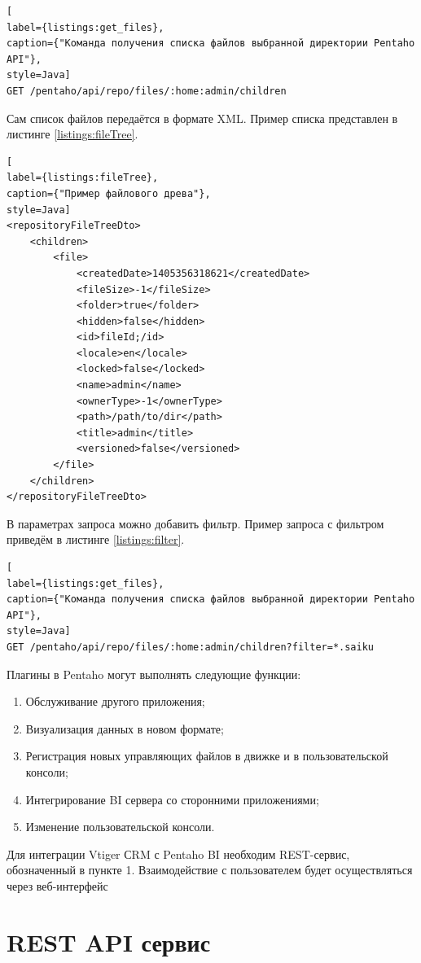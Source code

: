 \begin{lstlisting}[
label={listings:get_files},
caption={"Команда получения списка файлов выбранной директории Pentaho API"},
style=Java]
GET /pentaho/api/repo/files/:home:admin/children
\end{lstlisting}

Сам список файлов передаётся в формате XML. Пример списка представлен в листинге \ref{listings:fileTree}.

\begin{lstlisting}[
label={listings:fileTree},
caption={"Пример файлового древа"},
style=Java]
<repositoryFileTreeDto>
	<children>
		<file>
			<createdDate>1405356318621</createdDate>
			<fileSize>-1</fileSize>
			<folder>true</folder>
			<hidden>false</hidden>
			<id>fileId;/id>
			<locale>en</locale>
			<locked>false</locked>
			<name>admin</name>
			<ownerType>-1</ownerType>
			<path>/path/to/dir</path>
			<title>admin</title>
			<versioned>false</versioned>
		</file>
	</children>
</repositoryFileTreeDto>
\end{lstlisting}

В параметрах запроса можно добавить фильтр. Пример запроса с фильтром приведём в листинге \ref{listings:filter}.

\begin{lstlisting}[
label={listings:get_files},
caption={"Команда получения списка файлов выбранной директории Pentaho API"},
style=Java]
GET /pentaho/api/repo/files/:home:admin/children?filter=*.saiku
\end{lstlisting}

Плагины в Pentaho могут выполнять следующие функции:

\begin{enumerate}
	\item Обслуживание другого приложения;
	\item Визуализация данных в новом формате;
	\item Регистрация новых управляющих файлов в движке и в пользовательской консоли;
	\item Интегрирование BI сервера со сторонними приложениями;
	\item Изменение пользовательской консоли.
\end{enumerate}

Для интеграции Vtiger СRM с Pentaho BI необходим REST-сервис, обозначенный в пункте 1. Взаимодействие с пользователем будет осуществляться через веб-интерфейс

\section{REST API сервис}

